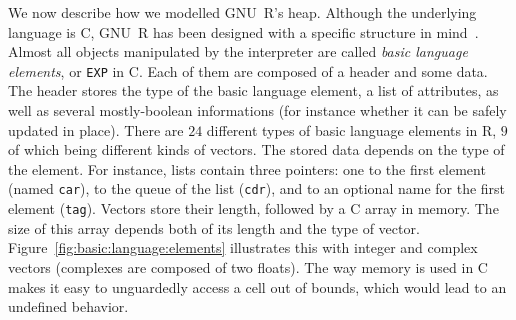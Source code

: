 \documentclass[
    sigplan,
    10pt,
    review, %
    natbib=false %
 ]{acmart}
\begin{document}
We now describe how we modelled GNU~R's heap.
Although the underlying language is C,
GNU~R has been designed with a specific structure in mind~\parencite{R}.
Almost all objects manipulated by the interpreter
are called \emph{basic language elements},
or \texttt{EXP} in C.
Each of them are composed of a header and some data.
%
The header stores the type of the basic language element,
a list of attributes,
as well as several mostly-boolean informations
(for instance whether it can be safely updated in place).
There are \(24\) different types of basic language elements in R,
\(9\) of which being different kinds of vectors.
%
The stored data depends on the type of the element.
For instance, lists contain three pointers:
one to the first element (named \texttt{car}),
to the queue of the list (\texttt{cdr}),
and to an optional name for the first element (\texttt{tag}).
Vectors store their length,
followed by a C array in memory.
The size of this array depends both of its length
and the type of vector.
Figure~\ref{fig:basic:language:elements} illustrates this
with integer and complex vectors
(complexes are composed of two floats).
%
The way memory is used in C
makes it easy to unguardedly access a cell out of bounds,
which would lead to an undefined behavior.
\end{document}
